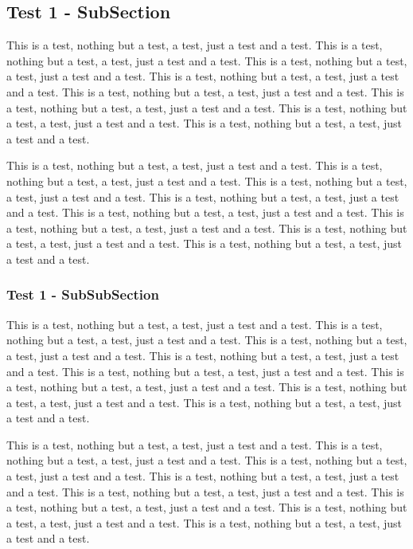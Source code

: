 
\subsection{Test 1 - SubSection}

This is a test, nothing but a test, a test, just a test and a test.
This is a test, nothing but a test, a test, just a test and a test.
This is a test, nothing but a test, a test, just a test and a test.
This is a test, nothing but a test, a test, just a test and a test.
This is a test, nothing but a test, a test, just a test and a test.
This is a test, nothing but a test, a test, just a test and a test.
This is a test, nothing but a test, a test, just a test and a test.
This is a test, nothing but a test, a test, just a test and a test.

This is a test, nothing but a test, a test, just a test and a test.
This is a test, nothing but a test, a test, just a test and a test.
This is a test, nothing but a test, a test, just a test and a test.
This is a test, nothing but a test, a test, just a test and a test.
This is a test, nothing but a test, a test, just a test and a test.
This is a test, nothing but a test, a test, just a test and a test.
This is a test, nothing but a test, a test, just a test and a test.
This is a test, nothing but a test, a test, just a test and a test.

\subsubsection{Test 1 - SubSubSection}

This is a test, nothing but a test, a test, just a test and a test.
This is a test, nothing but a test, a test, just a test and a test.
This is a test, nothing but a test, a test, just a test and a test.
This is a test, nothing but a test, a test, just a test and a test.
This is a test, nothing but a test, a test, just a test and a test.
This is a test, nothing but a test, a test, just a test and a test.
This is a test, nothing but a test, a test, just a test and a test.
This is a test, nothing but a test, a test, just a test and a test.

This is a test, nothing but a test, a test, just a test and a test.
This is a test, nothing but a test, a test, just a test and a test.
This is a test, nothing but a test, a test, just a test and a test.
This is a test, nothing but a test, a test, just a test and a test.
This is a test, nothing but a test, a test, just a test and a test.
This is a test, nothing but a test, a test, just a test and a test.
This is a test, nothing but a test, a test, just a test and a test.
This is a test, nothing but a test, a test, just a test and a test.
